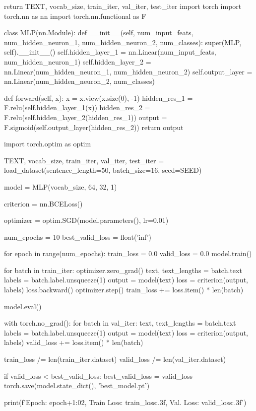 \documentclass[11pt]{article}
\begin{document}
\begin{python}
  return TEXT, vocab_size, train_iter, val_iter, test_iter
import torch
import torch.nn as nn
import torch.nn.functional as F

class MLP(nn.Module):
    def __init__(self, num_input_feats, num_hidden_neuron_1, num_hidden_neuron_2, num_classes):
        super(MLP, self).__init__()
        self.hidden_layer_1 = nn.Linear(num_input_feats, num_hidden_neuron_1)
        self.hidden_layer_2 = nn.Linear(num_hidden_neuron_1, num_hidden_neuron_2)
        self.output_layer = nn.Linear(num_hidden_neuron_2, num_classes)
        
    def forward(self, x):
        x = x.view(x.size(0), -1)
        hidden_res_1 = F.relu(self.hidden_layer_1(x))
        hidden_res_2 = F.relu(self.hidden_layer_2(hidden_res_1))
        output = F.sigmoid(self.output_layer(hidden_res_2))
        return output

    import torch.optim as optim


TEXT, vocab_size, train_iter, val_iter, test_iter = load_dataset(sentence_length=50, batch_size=16, seed=SEED)

model = MLP(vocab_size, 64, 32, 1)

criterion = nn.BCELoss()

optimizer = optim.SGD(model.parameters(), lr=0.01)

num_epochs = 10
best_valid_loss = float('inf')

for epoch in range(num_epochs):
    train_loss = 0.0
    valid_loss = 0.0
    model.train()
    
    for batch in train_iter:
        optimizer.zero_grad()
        text, text_lengths = batch.text
        labels = batch.label.unsqueeze(1)
        output = model(text)
        loss = criterion(output, labels)
        loss.backward()
        optimizer.step()
        train_loss += loss.item() * len(batch)
    
    model.eval()
    
    with torch.no_grad():
        for batch in val_iter:
            text, text_lengths = batch.text
            labels = batch.label.unsqueeze(1)
            output = model(text)
            loss = criterion(output, labels)
            valid_loss += loss.item() * len(batch)
    
    train_loss /= len(train_iter.dataset)
    valid_loss /= len(val_iter.dataset)
    
    if valid_loss < best_valid_loss:
        best_valid_loss = valid_loss
        torch.save(model.state_dict(), 'best_model.pt')
    
    print(f'Epoch: {epoch+1:02}, Train Loss: {train_loss:.3f}, Val. Loss: {valid_loss:.3f}')



\end{python}
\end{document}
